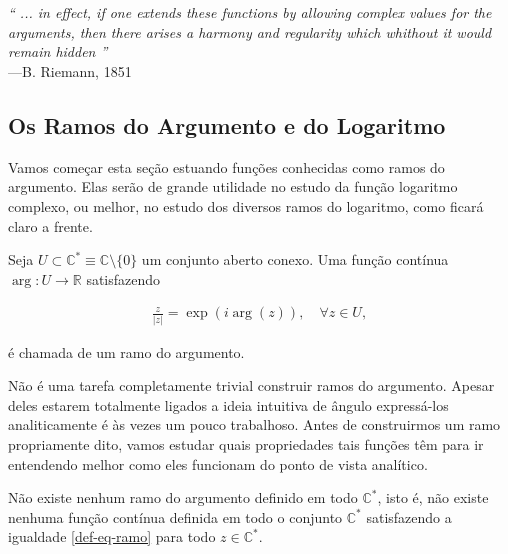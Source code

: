 \chapter[Semana 4]{}
\chaptermark{}

\hfill%
\begin{minipage}{13cm}
\begin{flushright}
\rightskip=0.5cm
\textit{``
	... in effect, if one extends these functions by allowing complex values for the arguments, then 
	there arises a harmony and regularity which whithout it would remain hidden ''}
\\[0.1cm]
\rightskip=0.5cm
---B. Riemann, 1851
\end{flushright}
\end{minipage}




\section{Os Ramos do Argumento e do Logaritmo}

Vamos começar esta seção estuando funções conhecidas como ramos do argumento.
Elas serão de grande utilidade no estudo da função logaritmo complexo, ou melhor,
no estudo dos diversos ramos do logaritmo, como ficará claro a frente.

\begin{definicao}
\label{def-ramo-argumento}
Seja $U\subset \mathbb{C}^{*}\equiv \mathbb{C}\setminus\{0\}$ um conjunto aberto conexo. Uma função contínua $\arg:U\to\mathbb{R}$
satisfazendo 

\begin{align}\label{def-eq-ramo}
\frac{z}{|z|}=\exp(i\arg(z)), \quad \forall z\in U,
\end{align}

é chamada de um ramo do argumento.
\end{definicao}


Não é uma tarefa completamente trivial construir ramos do argumento. Apesar 
deles estarem totalmente ligados a ideia intuitiva de ângulo expressá-los
analiticamente é às vezes um pouco trabalhoso. Antes de construirmos um ramo
propriamente dito, vamos estudar quais propriedades tais funções têm para
ir entendendo melhor como eles funcionam do ponto de vista analítico. 

\begin{proposicao}
Não existe nenhum ramo do argumento definido em todo $\mathbb{C}^{*}$, isto é,
não existe nenhuma função contínua definida em todo o conjunto $\mathbb{C}^{*}$
satisfazendo a igualdade \eqref{def-eq-ramo} para todo $z\in\mathbb{C}^{*}$.
\end{proposicao}

